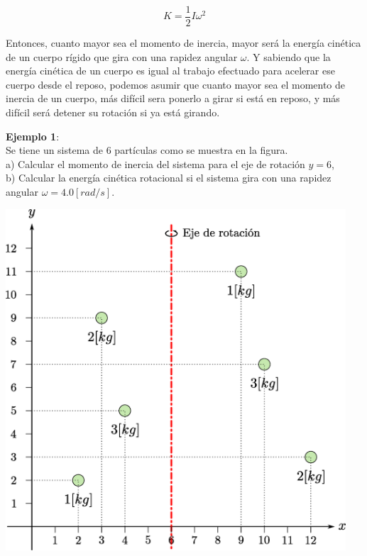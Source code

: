 \documentclass[letter,oneside,11pt]{article}
\begin{document}
\begin{equation}
    K = \frac{1}{2} I \omega^2
\label{cineticarotacional}
\end{equation}

Entonces, cuanto mayor sea el momento de inercia, mayor será la energía cinética
de un cuerpo rígido que gira con una rapidez angular $\omega$. Y sabiendo que la
energía cinética de un cuerpo es igual al trabajo efectuado para acelerar ese
cuerpo desde el reposo, podemos asumir que cuanto mayor sea el momento de
inercia de un cuerpo, más difícil sera ponerlo a girar si está en reposo, y más
difícil será detener su rotación si ya está girando.

\begin{minipage}[b]{.4\linewidth}
\textbf{Ejemplo 1}:\\
Se tiene un sistema de 6 partículas como se muestra en la figura. \\

a) Calcular el momento de inercia del sistema para el eje de rotación $y = 6$, \\
b) Calcular la energía cinética rotacional si el sistema gira con una rapidez
angular $\omega = 4.0 [rad/s]$.
\end{minipage}\hfill
\begin{minipage}{.5\linewidth}
\includegraphics[width=0.95\textwidth]{resources/f2.eps}
\end{minipage}
\end{document}
